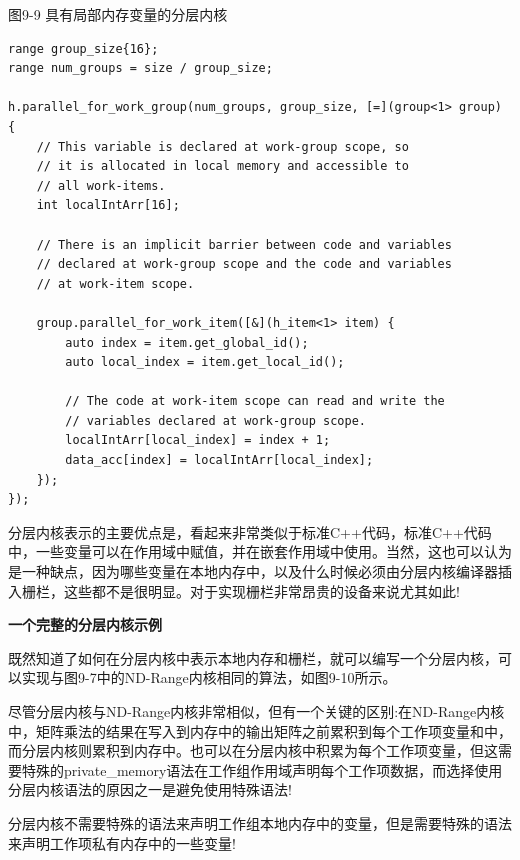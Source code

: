 \hspace*{\fill} \par %
图9-9 具有局部内存变量的分层内核
\begin{lstlisting}[caption={}]
range group_size{16};
range num_groups = size / group_size;

h.parallel_for_work_group(num_groups, group_size, [=](group<1> group) {
	// This variable is declared at work-group scope, so
	// it is allocated in local memory and accessible to
	// all work-items.
	int localIntArr[16];
	
	// There is an implicit barrier between code and variables
	// declared at work-group scope and the code and variables
	// at work-item scope.
	
	group.parallel_for_work_item([&](h_item<1> item) {
		auto index = item.get_global_id();
		auto local_index = item.get_local_id();
		
		// The code at work-item scope can read and write the
		// variables declared at work-group scope.
		localIntArr[local_index] = index + 1;
		data_acc[index] = localIntArr[local_index];
	});
});
\end{lstlisting}

分层内核表示的主要优点是，看起来非常类似于标准C++代码，标准C++代码中，一些变量可以在作用域中赋值，并在嵌套作用域中使用。当然，这也可以认为是一种缺点，因为哪些变量在本地内存中，以及什么时候必须由分层内核编译器插入栅栏，这些都不是很明显。对于实现栅栏非常昂贵的设备来说尤其如此!\par

\hspace*{\fill} \par %
\textbf{一个完整的分层内核示例}

既然知道了如何在分层内核中表示本地内存和栅栏，就可以编写一个分层内核，可以实现与图9-7中的ND-Range内核相同的算法，如图9-10所示。\par

尽管分层内核与ND-Range内核非常相似，但有一个关键的区别:在ND-Range内核中，矩阵乘法的结果在写入到内存中的输出矩阵之前累积到每个工作项变量和中，而分层内核则累积到内存中。也可以在分层内核中积累为每个工作项变量，但这需要特殊的private\_memory语法在工作组作用域声明每个工作项数据，而选择使用分层内核语法的原因之一是避免使用特殊语法!\par

\begin{tcolorbox}[colback=red!5!white,colframe=red!75!black]
分层内核不需要特殊的语法来声明工作组本地内存中的变量，但是需要特殊的语法来声明工作项私有内存中的一些变量!
\end{tcolorbox}

